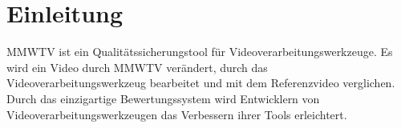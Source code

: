 \chapter{Einleitung}
\begin{normalsize}

MMWTV ist ein Qualitätssicherungstool für Videoverarbeitungswerkzeuge. %
Es wird ein Video durch MMWTV verändert, durch das Videoverarbeitungswerkzeug bearbeitet und mit dem Referenzvideo verglichen.
Durch das einzigartige Bewertungssystem wird Entwicklern von Videoverarbeitungswerkzeugen
das Verbessern ihrer Tools erleichtert.


\end{normalsize}


